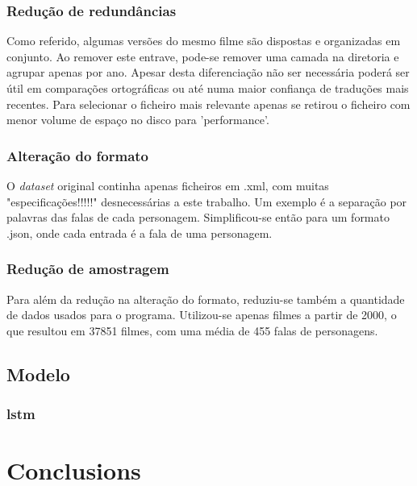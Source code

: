 \documentclass{article}
\begin{document}
\subsubsection{Redução de redundâncias}
Como referido, algumas versões do mesmo filme são dispostas e organizadas em conjunto. Ao remover este entrave, pode-se remover uma camada na diretoria e agrupar apenas por ano. Apesar desta diferenciação não ser necessária poderá ser útil em comparações ortográficas ou até numa maior confiança de traduções mais recentes. Para selecionar o ficheiro mais relevante apenas se retirou o ficheiro com menor volume de espaço no disco para 'performance'.

\subsubsection{Alteração do formato}
O \textit{dataset} original continha apenas ficheiros em .xml, com muitas "especificações!!!!!" desnecessárias a este trabalho. Um exemplo é a separação por palavras das falas de cada personagem. Simplificou-se então para um formato .json, onde cada entrada é a fala de uma personagem.

\subsubsection{Redução de amostragem}
Para além da redução na alteração do formato, reduziu-se também a quantidade de dados usados para o programa. Utilizou-se apenas filmes a partir de 2000, o que resultou em 37851 filmes, com uma média de 455 falas de personagens.

\subsection{Modelo}

\subsubsection{lstm}




\section{Conclusions}



\end{document}
